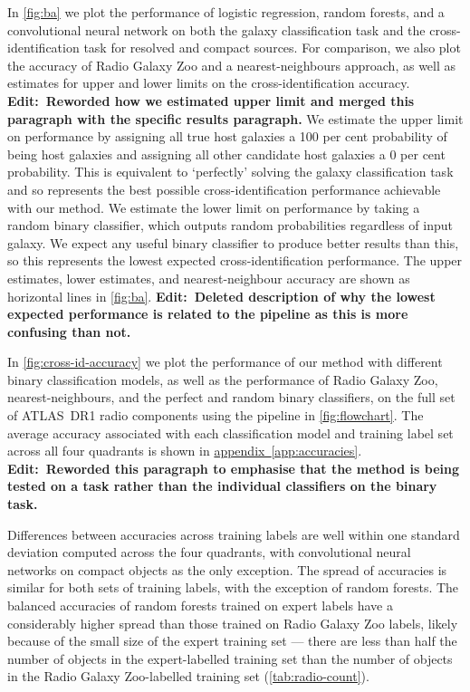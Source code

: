 \documentclass[fleqn,usenatbib,usedcolumn]{mnras}
\newcommand{\edit}[1]{{\bf Edit:~{#1}}}
\newcommand{\aref}[1]{\hyperref[#1]{appendix~\ref{#1}}}
\begin{document}
    In \autoref{fig:ba} we plot the performance of logistic regression, random forests, and a convolutional neural network on both the galaxy
    classification task and the cross-identification task for resolved and compact sources. For comparison, we also plot the accuracy of Radio Galaxy
    Zoo and a nearest-neighbours approach, as well as estimates for upper and lower limits on the cross-identification accuracy. \edit{Reworded how we estimated upper limit and merged this paragraph with the specific results paragraph.} We estimate the upper limit on performance by assigning all true host galaxies a 100 per cent probability of being host galaxies and assigning all other candidate host galaxies a 0 per cent probability. This is equivalent to `perfectly' solving the galaxy classification task and so represents the best possible cross-identification performance achievable with our method. We estimate the lower limit on performance by taking a random binary classifier, which outputs random probabilities regardless of input galaxy. We expect any useful binary classifier to produce better results than this, so this represents the lowest expected cross-identification performance. The upper estimates, lower estimates, and nearest-neighbour accuracy are shown as horizontal lines in \autoref{fig:ba}. \edit{Deleted description of why the lowest expected performance is related to the pipeline as this is more confusing than not.}

    In \autoref{fig:cross-id-accuracy} we plot the performance of our method with different binary classification models, as well as the performance of Radio Galaxy Zoo, nearest-neighbours, and the perfect and random binary classifiers, on the full set of ATLAS~DR1 radio components using the pipeline in \autoref{fig:flowchart}. The average accuracy associated with each classification model and training label set across all four quadrants is shown in \aref{app:accuracies}. \edit{Reworded this paragraph to emphasise that the method is being tested on a task rather than the individual classifiers on the binary task.}

    Differences between accuracies across training labels are well within one standard deviation computed across the four quadrants, with convolutional neural networks on compact objects as the only exception. The spread of accuracies is similar for both sets of training labels, with the exception of random forests. The balanced accuracies of random forests trained on expert labels have a considerably higher spread than those trained on Radio Galaxy Zoo labels, likely because of the small size of the expert training set --- there are less than half the number of objects in the expert-labelled training set than the number of objects in the Radio Galaxy Zoo-labelled training set (\autoref{tab:radio-count}).
\end{document}
